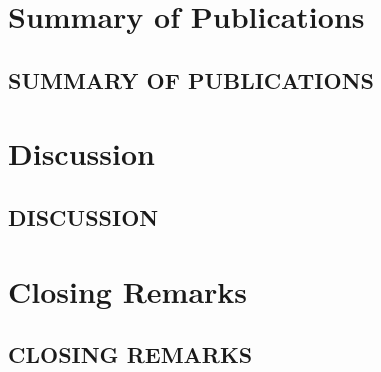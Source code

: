 \documentclass[english]{his-thesis}
\begin{document}


\part*{Summary of Publications}
\label{part:summary-publications}


\chapter{SUMMARY OF PUBLICATIONS}
\label{ch:publications}





\part*{Discussion}
\label{part:discussion}


\chapter{DISCUSSION}
\label{ch:discussion}





\part*{Closing Remarks}
\label{part:closing-remarks}

\chapter{CLOSING REMARKS}
\label{ch:conclusions}





\setlength{}
\listofreferences




\begin{fullarticles}

\end{fullarticles}
\end{document}
